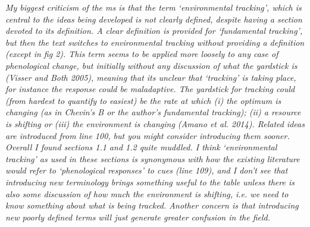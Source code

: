 \documentclass[11pt,letterpaper]{article}
\begin{document}
\emph{My biggest criticism of the ms is that the term `environmental tracking', which is central to
the ideas being developed is not clearly defined, despite having a section devoted to its
definition. A clear definition is provided for `fundamental tracking', but then the text
switches to environmental tracking without providing a definition (except in fig 2). This
term seems to be applied more loosely to any case of phenological change, but initially
without any discussion of what the yardstick is (Visser and Both 2005), meaning that its
unclear that `tracking' is taking place, for instance the response could be maladaptive. The
yardstick for tracking could (from hardest to quantify to easiest) be the rate at which (i)
the optimum is changing (as in Chevin's B or the author's fundamental tracking); (ii) a
resource is shifting or (iii) the environment is changing (Amano et al. 2014). Related ideas
are introduced from line 100, but you might consider introducing them sooner. Overall I found
sections 1.1 and 1.2 quite muddled. I think `environmental tracking' as used in these
sections is synonymous with how the existing literature would refer to `phenological
responses' to cues (line 109), and I don't see that introducing new terminology brings
something useful to the table unless there is also some discussion of how much the
environment is shifting, i.e. we need to know something about what is being tracked.  Another
concern is that introducing new poorly defined terms will just generate greater confusion in
the field.}\\
\end{document}
